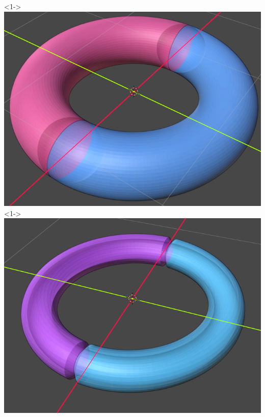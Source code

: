 \documentclass[UTF8]{ctexbeamer}	%
\theoremstyle{plain}
\theoremstyle{definition}
\theoremstyle{remark}
\numberwithin{equation}{section}
\begin{document}
\begin{frame}
\begin{itemize}
\begin{columns}
   \end{columns}
   \vspace{0.1in}
   \begin{columns}
    <1->
    \includegraphics[width = \textwidth]{fig/ys1.png}
    <1->
    \includegraphics[width = \textwidth]{fig/ys3.png}
\end{columns}
    \end{itemize}
\end{frame}
\end{document}
